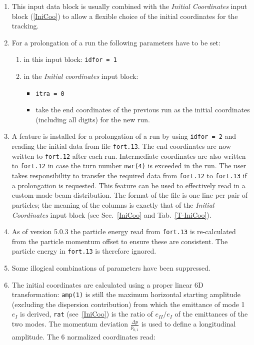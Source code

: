 \begin{enumerate}
    \item This input data block is usually combined with the \textit{Initial Coordinates} input block (\ref{IniCoo}) to allow a flexible choice of the initial coordinates for the tracking.
    \item For a prolongation of a run the following parameters have to be set:
    \begin{enumerate}
        \item in this input block: \texttt{idfor = 1}
        \item in the \textit{Initial coordinates} input block:
        \begin{itemize}
            \item \texttt{itra = 0}
            \item take the end coordinates of the previous run as the initial coordinates (including all digits) for the new run.
        \end{itemize}
    \end{enumerate}
    \item A feature is installed for a prolongation of a run by using \texttt{idfor = 2} and reading the initial data from file \texttt{fort.13}. The end coordinates are now written to \texttt{fort.12} after each run. Intermediate coordinates are also written to \texttt{fort.12} in case the turn number \texttt{nwr(4)} is exceeded in the run. The user takes responsibility to transfer the required data from \texttt{fort.12} to \texttt{fort.13} if a prolongation is requested. This feature can be used to effectively read in a custom-made beam distribution. The format of the file is one line per pair of particles; the meaning of the columns is exactly that of the \textit{Initial Coordinates} input block (see Sec.~\ref{IniCoo} and Tab.~\ref{T-IniCoo}).
    \item As of version 5.0.3 the particle energy read from \texttt{fort.13} is re-calculated from the particle momentum offset to ensure these are consistent. The particle energy in \texttt{fort.13} is therefore ignored.
    \item Some illogical combinations of parameters have been suppressed.
    \item The initial coordinates are calculated using a proper linear 6D transformation: \texttt{amp(1)} is still the maximum horizontal starting amplitude (excluding the dispersion contribution) from which the emittance of mode 1 $e_I$ is derived, \texttt{rat} (see~\ref{IniCoo}) is the ratio of $e_{II}/e_I$ of the emittances of the two modes. The momentum deviation $\frac{\Delta p}{p_{0,1}}$ is used to define a longitudinal amplitude. The 6 normalized coordinates read:

\end{enumerate}
